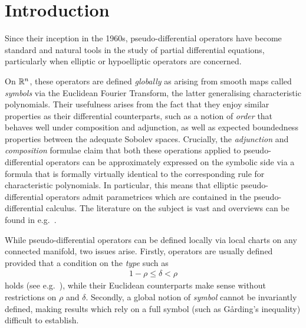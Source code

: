 \chapter{Introduction}

Since their inception in the 1960s,
pseudo-differential operators have become standard and natural tools in the study of partial differential equations,
particularly when elliptic or hypoelliptic operators are concerned.

On $\mathbb{R}^n$,
these operators are defined \emph{globally} as arising from smooth maps called \emph{symbols} via the Euclidean Fourier Transform,
the latter generalising characteristic polynomials.
Their usefulness arises from the fact that they enjoy similar properties as their differential counterparts,
such as a notion of \emph{order} that behaves well under composition and adjunction,
as well as expected boundedness properties between the adequate Sobolev spaces.
Crucially,
the \emph{adjunction} and \emph{composition} formulae claim that
both these operations applied to pseudo-differential operators can be approximately expressed on the symbolic side via a formula that is formally virtually identical to the corresponding rule for characteristic polynomials.
In particular,
this means that elliptic pseudo-differential operators admit parametrices which are contained in the pseudo-differential calculus.
The literature on the subject is vast and
overviews can be found in e.g.~\cite{Shubin01,Hormander07}.

While pseudo-differential operators can be defined locally via local charts on any connected manifold,
two issues arise.
Firstly,
operators are usually defined provided that a condition on the \emph{type} such as
\begin{align*}
    1 - \rho \leq \delta < \rho
\end{align*}
holds (see e.g.~\cite[Section 4]{Shubin01}),
while their Euclidean counterparts make sense without restrictions on $\rho$ and $\delta$.
Secondly,
a global notion of \emph{symbol} cannot be invariantly defined,
making results which rely on a full symbol (such as Gårding's inequality) difficult to establish.

